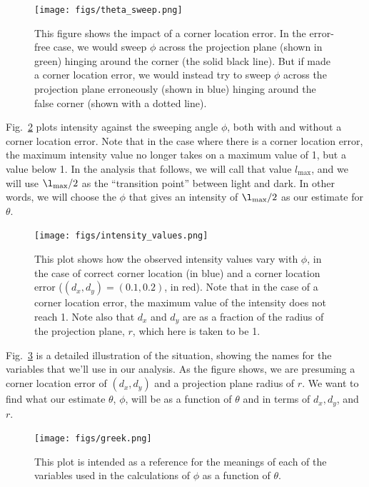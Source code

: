 \documentclass[11pt]{article}
\begin{document}
\begin{figure}
\centering
\texttt{[image: figs/theta\_sweep.png]}
\caption{This figure shows the impact of a corner location error. In the error-free case, we would sweep $\phi$ across the projection plane (shown in green) hinging around the corner (the solid black line). But if made a corner location error, we would instead try to sweep $\phi$ across the projection plane erroneously (shown in blue) hinging around the false corner (shown with a dotted line). \label{fig:theta_sweep}}
\end{figure}


Fig.~\ref{fig:intensity_values} plots intensity against the sweeping angle $\phi$, both with and without a corner location error. Note that in the case where there is a corner location error, the maximum intensity value no longer takes on a maximum value of 1, but a value below 1. In the analysis that follows, we will call that value $l_{\mathrm{max}}$, and we will use $\l_{\mathrm{max}}/2$ as the ``transition point'' between light and dark. In other words, we will choose the $\phi$ that gives an intensity of $\l_{\mathrm{max}}/2$ as our estimate for $\theta$.

\begin{figure}
\centering
\texttt{[image: figs/intensity\_values.png]}
\caption{This plot shows how the observed intensity values vary with $\phi$, in the case of correct corner location (in blue) and a corner location error ($(d_x, d_y) = (0.1, 0.2)$, in red). Note that in the case of a corner location error, the maximum value of the intensity does not reach 1. Note also that $d_x$ and $d_y$ are as a fraction of the radius of the projection plane, $r$, which here is taken to be 1. \label{fig:intensity_values}}
\end{figure}

Fig.~\ref{fig:greek} is a detailed illustration of the situation, showing the names for the variables that we'll use in our analysis. As the figure shows, we are presuming a corner location error of $(d_x, d_y)$ and a projection plane radius of $r$. We want to find what our estimate $\theta$, $\phi$, will be as a function of $\theta$ and in terms of $d_x, d_y$, and $r$.

\begin{figure}
\centering
\texttt{[image: figs/greek.png]}
\caption{This plot is intended as a reference for the meanings of each of the variables used in the calculations of $\phi$ as a function of $\theta$. \label{fig:greek}}
\end{figure}
\end{document}
